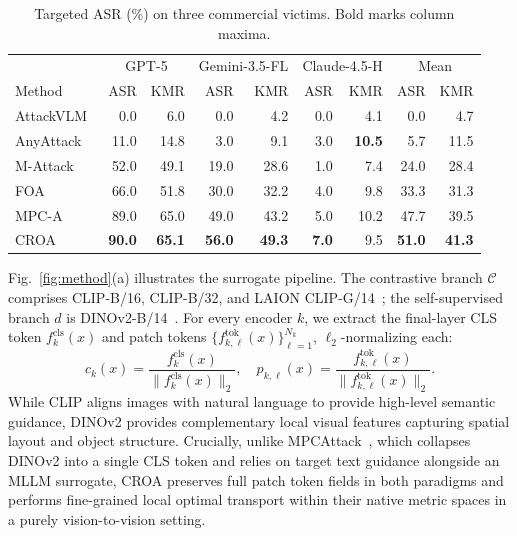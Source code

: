\documentclass{article}
\newcommand{\ours}{\textsc{CROA}}
\begin{document}
\begin{table}[t]
\centering
\caption{Targeted ASR (\%) on three commercial victims. Bold marks column maxima.}
\label{tab:main}
\small
\setlength{\tabcolsep}{8pt}
\begin{tabular}{lrrrrrrrr}
\toprule
& \multicolumn{2}{c}{GPT-5} & \multicolumn{2}{c}{Gemini-3.5-FL} & \multicolumn{2}{c}{Claude-4.5-H} & \multicolumn{2}{c}{Mean} \\
Method & ASR & KMR & ASR & KMR & ASR & KMR & ASR & KMR \\
\midrule
AttackVLM~\cite{attackvlm} & 0.0 & 6.0 & 0.0 & 4.2 & 0.0 & 4.1 & 0.0 & 4.7 \\
AnyAttack~\cite{anyattack} & 11.0 & 14.8 & 3.0 & 9.1 & 3.0 & \textbf{10.5} & 5.7 & 11.5 \\
M-Attack~\cite{mattack} & 52.0 & 49.1 & 19.0 & 28.6 & 1.0 & 7.4 & 24.0 & 28.4 \\
FOA~\cite{foa} & 66.0 & 51.8 & 30.0 & 32.2 & 4.0 & 9.8 & 33.3 & 31.3 \\
MPC-A~\cite{mpcattack} & 89.0 & 65.0 & 49.0 & 43.2 & 5.0 & 10.2 & 47.7 & 39.5 \\
\ours{} & \textbf{90.0} & \textbf{65.1} & \textbf{56.0} & \textbf{49.3} & \textbf{7.0} & 9.5 & \textbf{51.0} & \textbf{41.3} \\
\bottomrule
\end{tabular}
\end{table}
Fig.~\ref{fig:method}(a) illustrates the surrogate pipeline. The contrastive branch $\mathcal C$ comprises CLIP-B/16, CLIP-B/32,
and LAION CLIP-G/14~\cite{clip,laion}; the self-supervised branch $d$
is DINOv2-B/14~\cite{dinov2}. For every encoder $k$, we extract the
final-layer CLS token $f^{\mathrm{cls}}_k(x)$ and patch tokens
$\{f^{\mathrm{tok}}_{k,\ell}(x)\}_{\ell=1}^{N_k}$, $\ell_2$-normalizing each:
\begin{equation}
c_k(x)=\frac{f^{\mathrm{cls}}_k(x)}{\|f^{\mathrm{cls}}_k(x)\|_2},\quad
p_{k,\ell}(x)=\frac{f^{\mathrm{tok}}_{k,\ell}(x)}{\|f^{\mathrm{tok}}_{k,\ell}(x)\|_2}.
\end{equation}
While CLIP aligns images with natural language to provide high-level
semantic guidance, DINOv2 provides complementary local visual features
capturing spatial layout and object structure. Crucially, unlike
MPCAttack~\cite{mpcattack}, which collapses DINOv2 into a single CLS
token and relies on target text guidance alongside an MLLM surrogate,
CROA preserves full patch token fields in both paradigms and performs
fine-grained local optimal transport within their native metric spaces
in a purely vision-to-vision setting.
\end{document}
